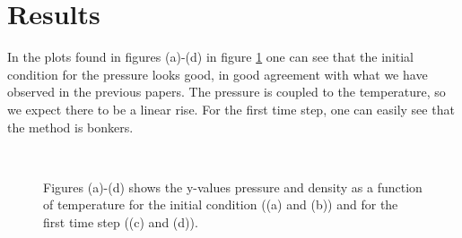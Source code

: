 \documentclass[a4paper,10pt]{article}
\begin{document}
\section{Results}
In the plots found in figures (a)-(d) in figure \ref{fig:plot} one can see that the initial condition for the pressure looks good, in good agreement with what we have observed in the previous papers. The pressure is coupled to the temperature, so we expect there to be a linear rise. For the first time step, one can easily see that the method is bonkers.
\begin{figure}[!]
\centering
{}
 \\
\caption{Figures (a)-(d) shows the y-values pressure and density as a function of temperature for the initial condition ((a) and (b)) and for the first time step ((c) and (d)).}
\label{fig:plot}
\end{figure}
\end{document}
